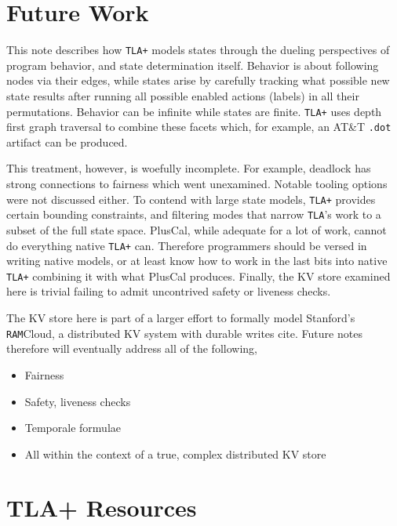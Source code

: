 \documentclass[twocolumn]{article}
\begin{document}
\section{Future Work}
This note describes how \texttt{TLA+} models states through the dueling perspectives of program behavior, and state determination itself. Behavior is about following nodes via their edges, while states arise by carefully tracking what possible new state results after running all possible enabled actions (labels) in all their permutations. Behavior can be infinite while states are finite. \texttt{TLA+} uses depth first graph traversal to combine these facets which, for example, an AT\&T \texttt{.dot} artifact can be produced.

This treatment, however, is woefully incomplete. For example, deadlock has strong connections to fairness which went unexamined. Notable tooling options were not discussed either. To contend with large state models, \texttt{TLA+} provides certain bounding constraints, and filtering modes that narrow \texttt{TLA}'s work to a subset of the full state space. PlusCal, while adequate for a lot of work, cannot do everything native \texttt{TLA+} can. Therefore programmers should be versed in writing native models, or at least know how to work in the last bits into native \texttt{TLA+} combining it with what PlusCal produces. Finally, the KV store examined here is trivial failing to admit uncontrived safety or liveness checks. 

The KV store here is part of a larger effort to formally model Stanford's \texttt{RAM}Cloud, a distributed KV system with durable writes cite. Future notes therefore will eventually address all of the following,

\begin{itemize}
\item Fairness
\item Safety, liveness checks
\item Temporale formulae
\item All within the context of a true, complex distributed KV store
\end{itemize}
\section{TLA+ Resources}



\end{document}
